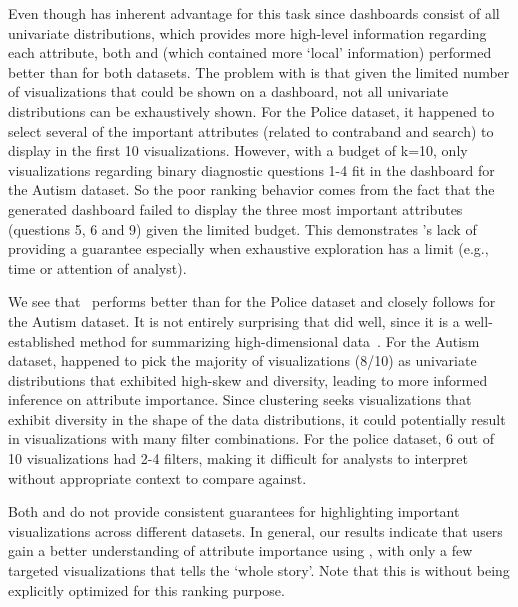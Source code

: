 \par Even though \BFS has inherent advantage for this task since \BFS dashboards consist of all univariate distributions, which provides more high-level information regarding each attribute, both \system and \cluster (which contained more `local' information) performed better than \BFS for both datasets. The problem with \BFS is that given the limited number of visualizations that could be shown on a dashboard, not all univariate distributions can be exhaustively shown. For the Police dataset, it happened to select several of the important attributes (related to contraband and search) to display in the first 10 visualizations. However, with a budget of k=10, only visualizations regarding binary diagnostic questions 1-4 fit in the dashboard for the Autism dataset. So the poor ranking behavior comes from the fact that the \BFS generated dashboard failed to display the three most important attributes (questions 5, 6 and 9) given the limited budget. This demonstrates \BFS's lack of providing a guarantee especially when exhaustive exploration has a limit (e.g., time or attention of analyst).
\par We see that \system\ performs better than \cluster for the Police dataset and closely follows \cluster for the Autism dataset. It is not entirely surprising that \cluster did well, since it is a well-established method for summarizing high-dimensional data~\cite{Han2005}. For the Autism dataset, \cluster happened to pick the majority of visualizations (8/10) as univariate distributions that exhibited high-skew and diversity, leading to more informed inference on attribute importance. Since clustering seeks visualizations that exhibit diversity in the shape of the data distributions, it could potentially result in visualizations with many filter combinations. For the police dataset, 6 out of 10 visualizations had 2-4 filters, making it difficult for analysts to interpret without appropriate context to compare against.
\par Both \BFS and \cluster do not provide consistent guarantees for highlighting important visualizations across different datasets. In general, our results indicate that users gain a better understanding of attribute importance using \system, with only a few targeted visualizations that tells the `whole story'. Note that this is without \system being explicitly optimized for this ranking purpose.
